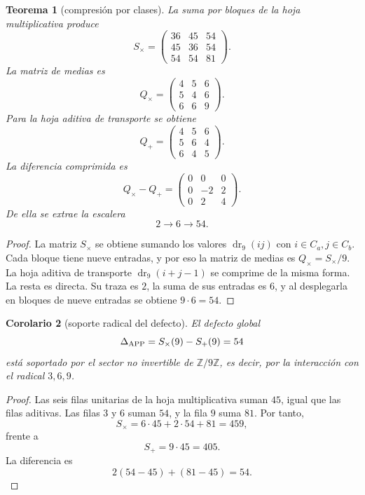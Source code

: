 \documentclass[11pt,a4paper]{article}
\newtheorem{teorema}{Teorema}
\newtheorem{corolario}[teorema]{Corolario}
\newcommand{\dr}{\operatorname{dr}_9}
\newcommand{\Z}{\mathbb Z}
\newcommand{\DeltaAPP}{\Delta_{\rm APP}}
\begin{document}
\begin{teorema}[compresi\'on por clases]
La suma por bloques de la hoja multiplicativa produce
\[
\boxed{
S_\times=
\begin{pmatrix}
36&45&54\\
45&36&54\\
54&54&81
\end{pmatrix}.}
\]
La matriz de medias es
\[
\boxed{
Q_\times=
\begin{pmatrix}
4&5&6\\
5&4&6\\
6&6&9
\end{pmatrix}.}
\]
Para la hoja aditiva de transporte se obtiene
\[
\boxed{
Q_+=
\begin{pmatrix}
4&5&6\\
5&6&4\\
6&4&5
\end{pmatrix}.}
\]
La diferencia comprimida es
\[
\boxed{
Q_\times-Q_+=
\begin{pmatrix}
0&0&0\\
0&-2&2\\
0&2&4
\end{pmatrix}.}
\]
De ella se extrae la escalera
\[
\boxed{2\longrightarrow 6\longrightarrow54.}
\]
\end{teorema}

\begin{proof}
La matriz \(S_\times\) se obtiene sumando los valores \(\dr(ij)\) con \(i\in C_a,j\in C_b\). Cada bloque tiene nueve entradas, y por eso la matriz de medias es \(Q_\times=S_\times/9\). La hoja aditiva de transporte \(\dr(i+j-1)\) se comprime de la misma forma. La resta es directa. Su traza es \(2\), la suma de sus entradas es \(6\), y al desplegarla en bloques de nueve entradas se obtiene \(9\cdot6=54\).
\end{proof}

\begin{corolario}[soporte radical del defecto]
El defecto global
\[
\DeltaAPP=S_\times(9)-S_+(9)=54
\]
est\'a soportado por el sector no invertible de \(\Z/9\Z\), es decir, por la interacci\'on con el radical \(3,6,9\).
\end{corolario}

\begin{proof}
Las seis filas unitarias de la hoja multiplicativa suman \(45\), igual que las filas aditivas. Las filas \(3\) y \(6\) suman \(54\), y la fila \(9\) suma \(81\). Por tanto,
\[
S_\times=6\cdot45+2\cdot54+81=459,
\]
frente a
\[
S_+=9\cdot45=405.
\]
La diferencia es
\[
2(54-45)+(81-45)=54.
\]
\end{proof}
\end{document}
